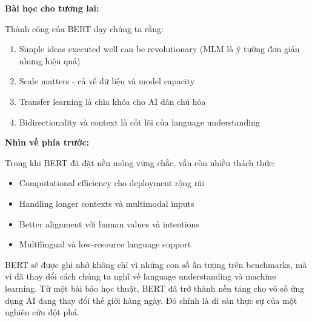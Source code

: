 \textbf{Bài học cho tương lai:}

Thành công của BERT dạy chúng ta rằng:
\begin{enumerate}
    \item Simple ideas executed well can be revolutionary (MLM là ý tưởng đơn giản nhưng hiệu quả)
    \item Scale matters - cả về dữ liệu và model capacity
    \item Transfer learning là chìa khóa cho AI dân chủ hóa
    \item Bidirectionality và context là cốt lõi của language understanding
\end{enumerate}

\textbf{Nhìn về phía trước:}

Trong khi BERT đã đặt nền móng vững chắc, vẫn còn nhiều thách thức:
\begin{itemize}
    \item Computational efficiency cho deployment rộng rãi
    \item Handling longer contexts và multimodal inputs
    \item Better alignment với human values và intentions
    \item Multilingual và low-resource language support
\end{itemize}

BERT sẽ được ghi nhớ không chỉ vì những con số ấn tượng trên benchmarks, mà vì đã thay đổi cách chúng ta nghĩ về language understanding và machine learning. Từ một bài báo học thuật, BERT đã trở thành nền tảng cho vô số ứng dụng AI đang thay đổi thế giới hàng ngày. Đó chính là di sản thực sự của một nghiên cứu đột phá.